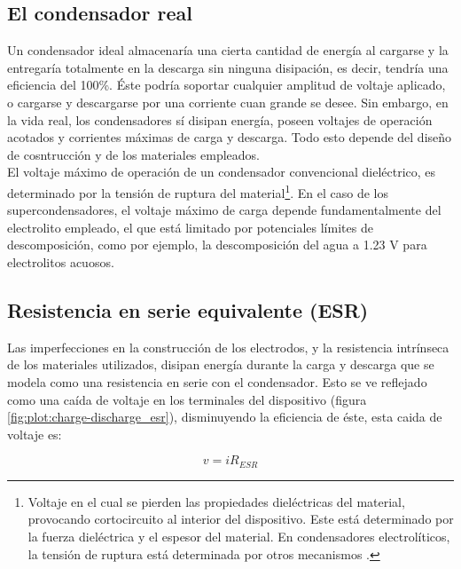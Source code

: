 \subsection{El condensador real}
Un condensador ideal almacenaría una cierta cantidad de energía al cargarse y la entregaría totalmente en la descarga sin ninguna disipación, es decir, tendría una eficiencia del 100\%. Éste podría soportar cualquier amplitud de voltaje aplicado, o cargarse y descargarse por una corriente cuan grande se desee.  Sin embargo, en la vida real, los condensadores sí disipan energía, poseen voltajes de operación acotados y corrientes máximas de carga y descarga. Todo esto depende del diseño de cosntrucción y de los materiales empleados.\\
El voltaje máximo de operación de un condensador convencional dieléctrico, es determinado por la tensión de ruptura del material\footnote{Voltaje en el cual se pierden las propiedades dieléctricas del material, provocando cortocircuito al interior del dispositivo. Este está determinado por la fuerza dieléctrica y el espesor del material. En condensadores electrolíticos, la tensión de ruptura está determinada por otros mecanismos \citep{Yahalom1971}.}. En el caso de los supercondensadores, el voltaje máximo de carga depende fundamentalmente del electrolito empleado, el que está limitado por potenciales límites de descomposición, como por ejemplo, la descomposición del agua a 1.23 V para electrolitos acuosos.\\

\subsection{Resistencia en serie equivalente (ESR)}
Las imperfecciones en la construcción de los electrodos, y la resistencia intrínseca de los materiales utilizados, disipan energía durante la carga y descarga que se modela como una resistencia en serie con el condensador. Esto se ve reflejado como una caída de voltaje en los terminales del dispositivo (figura \ref{fig:plot:charge-discharge_esr}), disminuyendo la eficiencia de éste, esta caida de voltaje es:

\begin{equation}
	v = iR_{ESR}
\end{equation}

